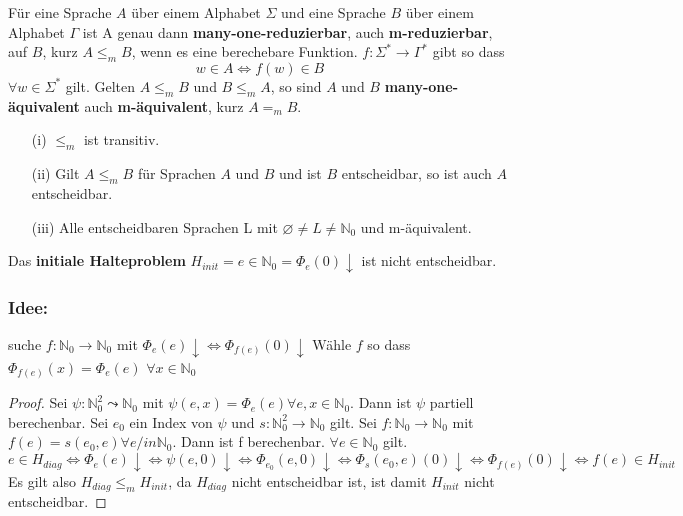  Für eine Sprache $A$ über einem Alphabet $\Sigma$ und eine Sprache $B$ über einem Alphabet $\Gamma$ ist A genau dann \textbf{many-one-reduzierbar}, auch \textbf{m-reduzierbar}, auf $B$, kurz $A \leq_m B$, wenn es eine berechebare Funktion. $f: \Sigma^* \to \Gamma^*$ gibt so dass \[w \in A \Leftrightarrow f(w)\in B\] $\forall w \in \Sigma^*$ gilt. Gelten $A \leq_m B$ und $B \leq_{m} A$, so sind $A$ und $B$ \textbf{many-one-äquivalent} auch \textbf{m-äquivalent}, kurz $A =_m B$.

\begin{itemize}
  \item [(i)] $\leq_m$ ist transitiv.
  \item [(ii)] Gilt $A \leq_m B$ für Sprachen $A$ und $B$ und ist $B$ entscheidbar, so ist auch $A$ entscheidbar.
  \item [(iii)] Alle entscheidbaren Sprachen L mit $\varnothing \not = L \not = \mathbb{N}_0$ und m-äquivalent.
\end{itemize}

 Das \textbf{initiale Halteproblem} $H_{init} = {e \in \mathbb{N}_0 = \Phi_e(0) \downarrow}$ ist nicht entscheidbar.

\subsubsection*{Idee: } suche $f:\mathbb{N}_0 \to \mathbb{N}_0$ mit $\Phi_e(e)\downarrow \Leftrightarrow \Phi_{f(e)}(0)\downarrow$ Wähle $f$ so dass $\Phi_{f(e)}(x) = \Phi_e(e)$ $\forall x \in \mathbb{N}_0$

\begin{proof}
  Sei $\psi : \mathbb{N}_0^2 \leadsto \mathbb{N}_0$ mit $\psi (e, x) = \Phi_e(e) \forall e, x \in \mathbb{N}_0$. Dann ist $\psi$ partiell berechenbar. Sei $e_0$ ein Index von $\psi$ und $s:\mathbb{N}_0^2 \to \mathbb{N}_0$ gilt. Sei $f: \mathbb{N}_0 \to \mathbb{N}_0$ mit $f(e) = s(e_0, e) \forall e /in \mathbb{N}_0$. Dann ist f berechenbar. $\forall e \in \mathbb{N}_0$ gilt. \[e \in H_{diag} \Leftrightarrow \Phi_e(e) \downarrow \Leftrightarrow \psi(e, 0) \downarrow \Leftrightarrow \Phi_{e_0}(e, 0) \downarrow \Leftrightarrow \Phi_s (e_0, e)(0)\downarrow \Leftrightarrow \Phi_{f(e)} (0)\downarrow \Leftrightarrow f(e) \in H_{init}\] Es gilt also $H_{diag} \leq_{m} H_{init}$, da $H_{diag}$ nicht entscheidbar ist, ist damit $H_{init}$ nicht entscheidbar.
\end{proof}


